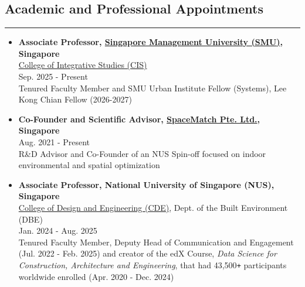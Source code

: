 \documentclass[10pt,a4paper]{article}
\begin{document}
\begin{small}
\subsection*{Academic and Professional Appointments}
\hrule
\vspace{0.2cm}
\begin{itemize}

\item 
{\bf Associate Professor, \href{https://www.smu.edu.sg/}{Singapore Management University (SMU)}, Singapore}\\
\href{https://cis.smu.edu.sg/}{College of Integrative Studies (CIS)}\\
Sep. 2025 - Present\\
Tenured Faculty Member and SMU Urban Institute Fellow (Systems), Lee Kong Chian Fellow (2026-2027)

\item 
{\bf Co-Founder and Scientific Advisor, \href{https://www.spacematch.me}{SpaceMatch Pte. Ltd.}, Singapore}\\
Aug. 2021 - Present\\
R\&D Advisor and Co-Founder of an NUS Spin-off focused on indoor environmental and spatial optimization

\item 
{\bf Associate Professor, National University of Singapore (NUS), Singapore}\\
\href{https://cde.nus.edu.sg}{College of Design and Engineering (CDE)}, Dept. of the Built Environment (DBE)\\
Jan. 2024 - Aug. 2025\\
Tenured Faculty Member, Deputy Head of Communication and Engagement (Jul. 2022 - Feb. 2025) and creator of the edX Course, \emph{Data Science for Construction, Architecture and Engineering}, that had 43,500\texttt{+} participants worldwide enrolled (Apr. 2020 - Dec. 2024)


\end{itemize}
\end{small}
\end{document}
